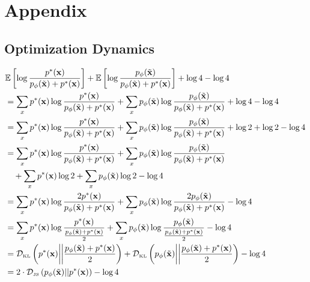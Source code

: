 \section{Appendix}


\subsection{Optimization Dynamics}
\label{sec:proof-for-jsd-thing}
\begin{small}
  \begin{align}
    & \mathbb{E}\left[\log{{\pt \over \pg + \pt}}\right] + \mathbb{E}\left[\log{\pg\over\pg + \pt}\right] + \log4 - \log4 \\
    & = \sum_{x}\pt\log{\pt \over \pg + \pt} + \sum_{x}\pg\log{\pg \over \pg + \pt} + \log4 - \log4 \\
    & = \sum_{x}\pt\log{\pt \over \pg + \pt} + \sum_{x}\pg\log{\pg \over \pg + \pt} + \log2 + \log2 - \log4 \\
    & = \sum_{x}\pt\log{\pt \over \pg + \pt} + \sum_{x}\pg\log{\pg
      \over \pg + \pt} \\
    & \quad + \sum_{x}\pt\log2 + \sum_{x}\pg\log2 - \log4 \\
    & = \sum_{x}\pt\log{2\pt \over \pg + \pt} + \sum_{x}\pg\log{2\pg \over \pg + \pt} - \log4 \\
    & = \sum_{x}\pt\log{\pt \over {\pg + \pt \over 2}} + \sum_{x}\pg\log{\pg \over {\pg + \pt \over 2}} - \log4 \\
    & = \KL{\pt}{\pg + \pt \over 2} + \KL{\pg}{\pg+\pt \over 2} - \log4 \\
    & = 2 \cdot \JSD{\pg}{\pt} - \log4
  \end{align}
\end{small}

